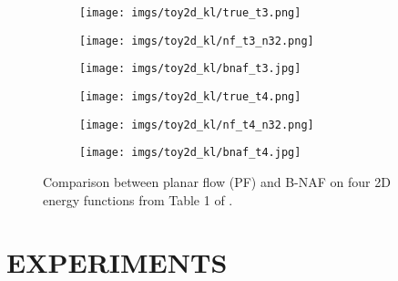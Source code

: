 \documentclass[letterpaper]{article}
\newcommand{\fw}{0.23\linewidth}
\begin{document}
\begin{figure}[t]
 \vspace{1em}
 \begin{subfigure}[b]{3mm}
 \vspace{2em}
 \end{subfigure}\begin{subfigure}[b]{\fw}
 \centering
 \vspace{-2mm}
 \texttt{[image: imgs/toy2d\_kl/true\_t3.png]}
 \end{subfigure}\hspace{1mm}\begin{subfigure}[b]{\fw}
 \centering
 \vspace{-2mm}
 \texttt{[image: imgs/toy2d\_kl/nf\_t3\_n32.png]}
 \end{subfigure}\hspace{1mm}\begin{subfigure}[b]{\fw}
 \centering
 \vspace{-2mm}
 \texttt{[image: imgs/toy2d\_kl/bnaf\_t3.jpg]}
 \end{subfigure}

 \vspace{1em}
 \begin{subfigure}[b]{3mm}
 \vspace{2em}
 \end{subfigure}\begin{subfigure}[b]{\fw}
 \centering
 \vspace{-2mm}
 \texttt{[image: imgs/toy2d\_kl/true\_t4.png]}
 \end{subfigure}\hspace{1mm}\begin{subfigure}[b]{\fw}
 \centering
 \vspace{-2mm}
 \texttt{[image: imgs/toy2d\_kl/nf\_t4\_n32.png]}
 \end{subfigure}\hspace{1mm}\begin{subfigure}[b]{\fw}
 \centering
 \vspace{-2mm}
 \texttt{[image: imgs/toy2d\_kl/bnaf\_t4.jpg]}
 \end{subfigure}\caption{Comparison between planar flow (PF) and B-NAF on four 2D energy functions from Table 1 of \citep{rezende2015variational}.}
 \label{fig:toy2d_kl}
\end{figure}

\section{EXPERIMENTS}
\end{document}
